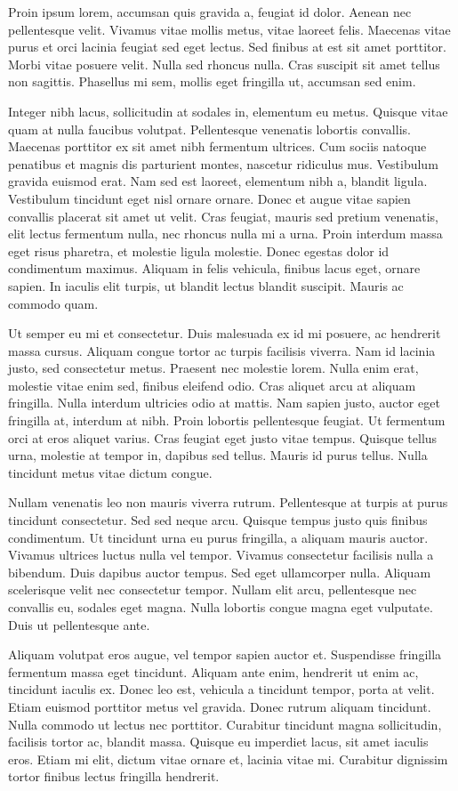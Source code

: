 Proin ipsum lorem, accumsan quis gravida a, feugiat id dolor. Aenean
nec pellentesque velit. Vivamus vitae mollis metus, vitae laoreet
felis. Maecenas vitae purus et orci lacinia feugiat sed eget lectus.
Sed finibus at est sit amet porttitor. Morbi vitae posuere velit.
Nulla sed rhoncus nulla. Cras suscipit sit amet tellus non sagittis.
Phasellus mi sem, mollis eget fringilla ut, accumsan sed enim. 

Integer nibh lacus, sollicitudin at sodales in, elementum eu metus.
Quisque vitae quam at nulla faucibus volutpat. Pellentesque venenatis
lobortis convallis. Maecenas porttitor ex sit amet nibh fermentum
ultrices. Cum sociis natoque penatibus et magnis dis parturient
montes, nascetur ridiculus mus. Vestibulum gravida euismod erat. Nam
sed est laoreet, elementum nibh a, blandit ligula. Vestibulum
tincidunt eget nisl ornare ornare. Donec et augue vitae sapien
convallis placerat sit amet ut velit. Cras feugiat, mauris sed pretium
venenatis, elit lectus fermentum nulla, nec rhoncus nulla mi a urna.
Proin interdum massa eget risus pharetra, et molestie ligula molestie.
Donec egestas dolor id condimentum maximus. Aliquam in felis vehicula,
finibus lacus eget, ornare sapien. In iaculis elit turpis, ut blandit
lectus blandit suscipit. Mauris ac commodo quam. 

Ut semper eu mi et consectetur. Duis malesuada ex id mi posuere, ac
hendrerit massa cursus. Aliquam congue tortor ac turpis facilisis
viverra. Nam id lacinia justo, sed consectetur metus. Praesent nec
molestie lorem. Nulla enim erat, molestie vitae enim sed, finibus
eleifend odio. Cras aliquet arcu at aliquam fringilla. Nulla interdum
ultricies odio at mattis. Nam sapien justo, auctor eget fringilla at,
interdum at nibh. Proin lobortis pellentesque feugiat. Ut fermentum
orci at eros aliquet varius. Cras feugiat eget justo vitae tempus.
Quisque tellus urna, molestie at tempor in, dapibus sed tellus. Mauris
id purus tellus. Nulla tincidunt metus vitae dictum congue. 

Nullam venenatis leo non mauris viverra rutrum. Pellentesque at turpis
at purus tincidunt consectetur. Sed sed neque arcu. Quisque tempus
justo quis finibus condimentum. Ut tincidunt urna eu purus fringilla,
a aliquam mauris auctor. Vivamus ultrices luctus nulla vel tempor.
Vivamus consectetur facilisis nulla a bibendum. Duis dapibus auctor
tempus. Sed eget ullamcorper nulla. Aliquam scelerisque velit nec
consectetur tempor. Nullam elit arcu, pellentesque nec convallis eu,
sodales eget magna. Nulla lobortis congue magna eget vulputate. Duis
ut pellentesque ante. 

Aliquam volutpat eros augue, vel tempor sapien auctor et. Suspendisse
fringilla fermentum massa eget tincidunt. Aliquam ante enim, hendrerit
ut enim ac, tincidunt iaculis ex. Donec leo est, vehicula a tincidunt
tempor, porta at velit. Etiam euismod porttitor metus vel gravida.
Donec rutrum aliquam tincidunt. Nulla commodo ut lectus nec porttitor.
Curabitur tincidunt magna sollicitudin, facilisis tortor ac, blandit
massa. Quisque eu imperdiet lacus, sit amet iaculis eros. Etiam mi
elit, dictum vitae ornare et, lacinia vitae mi. Curabitur dignissim
tortor finibus lectus fringilla hendrerit.
